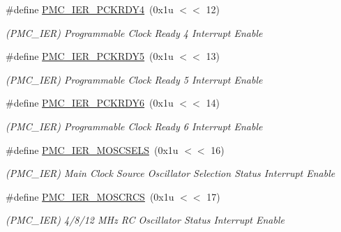 \begin{DoxyCompactItemize}
\#define \mbox{\hyperlink{group__SAME70__PMC_ga31be9f0cda08e0f5d90c39f9a45e3401}{P\+M\+C\+\_\+\+I\+E\+R\+\_\+\+P\+C\+K\+R\+D\+Y4}}~(0x1u $<$$<$ 12)
\begin{DoxyCompactList}\small\item\em (P\+M\+C\+\_\+\+I\+ER) Programmable Clock Ready 4 Interrupt Enable \end{DoxyCompactList}\item 
\mbox{\label{group__SAME70__PMC_gafabc6471c503bf8f0a248d24663a7025}} 
\#define \mbox{\hyperlink{group__SAME70__PMC_gafabc6471c503bf8f0a248d24663a7025}{P\+M\+C\+\_\+\+I\+E\+R\+\_\+\+P\+C\+K\+R\+D\+Y5}}~(0x1u $<$$<$ 13)
\begin{DoxyCompactList}\small\item\em (P\+M\+C\+\_\+\+I\+ER) Programmable Clock Ready 5 Interrupt Enable \end{DoxyCompactList}\item 
\mbox{\label{group__SAME70__PMC_ga7c5d0e3f5c33aee7b1daad878b63e145}} 
\#define \mbox{\hyperlink{group__SAME70__PMC_ga7c5d0e3f5c33aee7b1daad878b63e145}{P\+M\+C\+\_\+\+I\+E\+R\+\_\+\+P\+C\+K\+R\+D\+Y6}}~(0x1u $<$$<$ 14)
\begin{DoxyCompactList}\small\item\em (P\+M\+C\+\_\+\+I\+ER) Programmable Clock Ready 6 Interrupt Enable \end{DoxyCompactList}\item 
\mbox{\label{group__SAME70__PMC_ga49fddd4922d096f93940f1315798b2f0}} 
\#define \mbox{\hyperlink{group__SAME70__PMC_ga49fddd4922d096f93940f1315798b2f0}{P\+M\+C\+\_\+\+I\+E\+R\+\_\+\+M\+O\+S\+C\+S\+E\+LS}}~(0x1u $<$$<$ 16)
\begin{DoxyCompactList}\small\item\em (P\+M\+C\+\_\+\+I\+ER) Main Clock Source Oscillator Selection Status Interrupt Enable \end{DoxyCompactList}\item 
\mbox{\label{group__SAME70__PMC_ga7be59432ed75edc559d72c9c76105086}} 
\#define \mbox{\hyperlink{group__SAME70__PMC_ga7be59432ed75edc559d72c9c76105086}{P\+M\+C\+\_\+\+I\+E\+R\+\_\+\+M\+O\+S\+C\+R\+CS}}~(0x1u $<$$<$ 17)
\begin{DoxyCompactList}\small\item\em (P\+M\+C\+\_\+\+I\+ER) 4/8/12 M\+Hz RC Oscillator Status Interrupt Enable \end{DoxyCompactList}\item 
$$
\end{DoxyCompactItemize}
